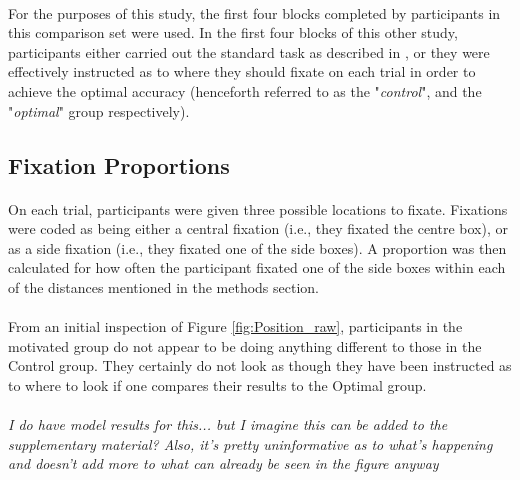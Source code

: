 \documentclass[12pt]{article}
\begin{document}
\paragraph{} For the purposes of this study, the first four blocks completed by participants in this comparison set were used. In the first four blocks of this other study, participants either carried out the standard task as described in \cite{clarke2015failure}, or they were effectively instructed as to where they should fixate on each trial in order to achieve the optimal accuracy (henceforth referred to as the "\textit{control}", and the "\textit{optimal}" group respectively).

\subsection*{Fixation Proportions}
\paragraph{} On each trial, participants were given three possible locations to fixate. Fixations were coded as being either a central fixation (i.e., they fixated the centre box), or as a side fixation (i.e., they fixated one of the side boxes). A proportion was then calculated for how often the participant fixated one of the side boxes within each of the distances mentioned in the methods section. 

\paragraph{} From an initial inspection of Figure \ref{fig:Position_raw}, participants in the motivated group do not appear to be doing anything different to those in the Control group. They certainly do not look as though they have been instructed as to where to look if one compares their results to the Optimal group. 

\paragraph{} \textit{I do have model results for this... but I imagine this can be added to the supplementary material? Also, it's pretty uninformative as to what's happening and doesn't add more to what can already be seen in the figure anyway}
\end{document}

